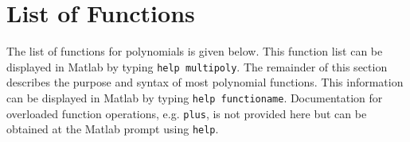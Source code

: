 \documentclass{article}
\begin{document}
\newpage
\section{List of Functions}
\label{sec:fulldoc}

The list of functions for polynomials is given below. This function
list can be displayed in Matlab by typing \texttt{help multipoly}.
The remainder of this section describes the purpose and syntax of most
polynomial functions.  This information can be displayed in Matlab by
typing \texttt{help functioname}.  Documentation for overloaded function
operations, e.g. \texttt{plus}, is not provided here but can be obtained
at the Matlab prompt using \texttt{help}.
\end{document}
